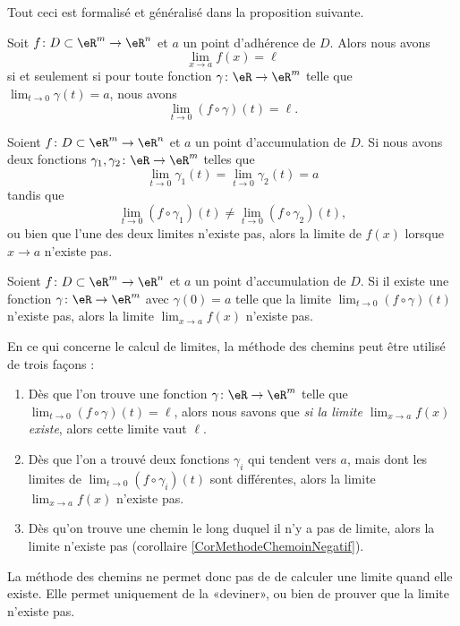 Tout ceci est formalisé et généralisé dans la proposition suivante.
\begin{proposition}
	Soit $f\colon D\subset\eR^m\to \eR^n$ et $a$ un point d'adhérence de $D$. Alors nous avons
	\begin{equation}
		\lim_{x\to a} f(x)=\ell
	\end{equation}
	si et seulement si pour toute fonction $\gamma\colon \eR\to \eR^m$ telle que $\lim_{t\to 0} \gamma(t)=a$, nous avons
	\begin{equation}
		\lim_{t\to 0} (f\circ\gamma)(t)=\ell.
	\end{equation}	
\end{proposition}

\begin{corollary}	\label{CorMethodeChemin}
	Soient $f\colon D\subset\eR^m\to \eR^n$ et $a$ un point d'accumulation de $D$. Si nous avons deux fonctions $\gamma_1,\gamma_2\colon \eR\to \eR^m$ telles que
	\begin{equation}
		\lim_{t\to 0} \gamma_1(t)=\lim_{t\to 0} \gamma_2(t)=a
	\end{equation}
	tandis que
	\begin{equation}
		\lim_{t\to 0} (f\circ \gamma_1)(t)\neq\lim_{t\to 0} (f\circ \gamma_2)(t),
	\end{equation}
	ou bien que l'une des deux limites n'existe pas, alors la limite de $f(x)$ lorsque $x\to a$ n'existe pas.
\end{corollary}

\begin{corollary}	\label{CorMethodeChemoinNegatif}
	Soient $f\colon D\subset\eR^m\to \eR^n$ et $a$ un point d'accumulation de $D$. Si il existe une fonction $\gamma\colon \eR\to \eR^m$ avec $\gamma(0)=a$ telle que la limite $\lim_{t\to 0} (f\circ\gamma)(t)$ n'existe pas, alors la limite $\lim_{x\to a} f(x)$ n'existe pas.
\end{corollary}

En ce qui concerne le calcul de limites, la méthode des chemins peut être utilisé de trois façons :
\begin{enumerate}
	\item
		Dès que l'on trouve une fonction $\gamma\colon \eR\to \eR^m$ telle que $\lim_{t\to 0} (f\circ \gamma)(t)=\ell$, alors nous savons que \emph{si la limite $\lim_{x\to a} f(x)$ existe}, alors cette limite vaut $\ell$.
	\item
		Dès que l'on a trouvé deux fonctions $\gamma_i$ qui tendent vers $a$, mais dont les limites de $\lim_{t\to 0} (f\circ\gamma_i)(t)$ sont différentes, alors la limite $\lim_{x\to a} f(x)$ n'existe pas.
	\item
		Dès qu'on trouve une chemin le long duquel il n'y a pas de limite, alors la limite n'existe pas (corollaire \ref{CorMethodeChemoinNegatif}).
\end{enumerate}
La méthode des chemins ne permet donc pas de de calculer une limite quand elle existe. Elle permet uniquement de la «deviner», ou bien de prouver que la limite n'existe pas.

